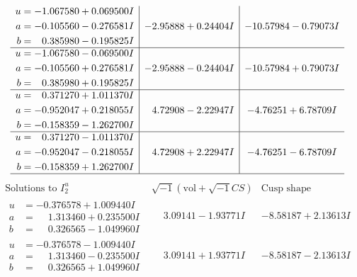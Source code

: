 \documentclass[1p]{elsarticle_modified}
\theoremstyle{definition}
\newcommand{\I}{\sqrt{-1}}
\begin{document}
$$\begin{array}{c|c|c}
\begin{aligned}
u &= -1.067580 + 0.069500 I \\
a &= -0.105560 - 0.276581 I \\
b &= \phantom{-}0.385980 - 0.195825 I\end{aligned}
 & -2.95888 + 0.24404 I & -10.57984 - 0.79073 I \\ \hline\begin{aligned}
u &= -1.067580 - 0.069500 I \\
a &= -0.105560 + 0.276581 I \\
b &= \phantom{-}0.385980 + 0.195825 I\end{aligned}
 & -2.95888 - 0.24404 I & -10.57984 + 0.79073 I \\ \hline\begin{aligned}
u &= \phantom{-}0.371270 + 1.011370 I \\
a &= -0.952047 + 0.218055 I \\
b &= -0.158359 - 1.262700 I\end{aligned}
 & \phantom{-}4.72908 - 2.22947 I & -4.76251 + 6.78709 I \\ \hline\begin{aligned}
u &= \phantom{-}0.371270 - 1.011370 I \\
a &= -0.952047 - 0.218055 I \\
b &= -0.158359 + 1.262700 I\end{aligned}
 & \phantom{-}4.72908 + 2.22947 I & -4.76251 - 6.78709 I\\
 \hline 
 \end{array}$$\newpage$$\begin{array}{c|c|c}  
\text{Solutions to }I^u_{2}& \I (\text{vol} + \sqrt{-1}CS) & \text{Cusp shape}\\
 \hline 
\begin{aligned}
u &= -0.376578 + 1.009440 I \\
a &= \phantom{-}1.313460 + 0.235500 I \\
b &= \phantom{-}0.326565 - 1.049960 I\end{aligned}
 & \phantom{-}3.09141 - 1.93771 I & -8.58187 + 2.13613 I \\ \hline\begin{aligned}
u &= -0.376578 - 1.009440 I \\
a &= \phantom{-}1.313460 - 0.235500 I \\
b &= \phantom{-}0.326565 + 1.049960 I\end{aligned}
 & \phantom{-}3.09141 + 1.93771 I & -8.58187 - 2.13613 I \\ \hline\begin{aligned}

\end{aligned}
\end{array}$$
\end{document}
